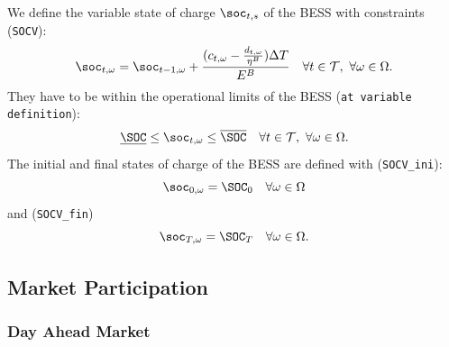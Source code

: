 We define the variable state of charge $\soc_{t, s}$ of the BESS with constraints (\verb|SOCV|): 
\begin{equation} \label{EQ:SOCV}
	\soc_{t, \omega} = \soc_{t - 1, \omega} + \frac{(c_{t, \omega} - \frac{d_{t, \omega}}{\eta^B})\Delta T}{E^B} \quad \forall t \in \mathcal{T}, \ \forall \omega \in \Omega. 
\end{equation} 
They have to be within the operational limits of the BESS (\verb|at variable definition|):
\begin{equation} \label{EQ:socVOperLimits}
	\underline{\SOC} \leq \soc_{t, \omega} \leq \overline{\SOC} \quad \forall t \in \mathcal{T}, \ \forall \omega \in \Omega.
\end{equation}
The initial and final states of charge of the BESS are defined with (\verb|SOCV_ini|):
\begin{equation} \label{EQ:SOCV_ini}
	\soc_{0, \omega} = \SOC_0 \quad \forall \omega \in \Omega
\end{equation}
and (\verb|SOCV_fin|)
\begin{equation} \label{EQ:SOCV_fin}
	\soc_{T, \omega} = \SOC_T \quad \forall \omega \in \Omega.
\end{equation}


\subsection{Market Participation}
\label{SEC:MarketParticipation}

\subsubsection{Day Ahead Market}

